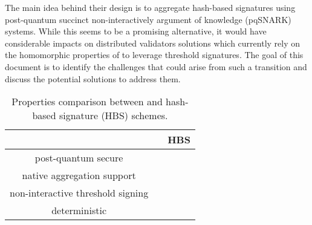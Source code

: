 The main idea behind their design is to aggregate hash-based signatures using post-quantum succinct non-interactively argument of knowledge (pqSNARK) systems. %
While this seems to be a promising alternative, it would have considerable impacts on distributed validators solutions which currently rely on the homomorphic properties of \BLS to leverage threshold signatures.
The goal of this document is to identify the challenges that could arise from such a transition and discuss the potential solutions to address them.


\renewcommand\arraystretch{1.25}
\begin{table}[h]
	\centering 
	\begin{tabular}{ccc}
		\toprule
    		& \BLS & HBS \\
    		\midrule
    		post-quantum secure & \xmark & \cmark \\
    		native aggregation support & \cmark  & \xmark \\
    		non-interactive threshold signing & \cmark  & \xmark\\
    		deterministic & \cmark & \xmark\\
    		\bottomrule
	\end{tabular}
	\caption{Properties comparison between \BLS and hash-based signature (HBS) schemes.\label{tab:bls_vs_hbs}}
\end{table}